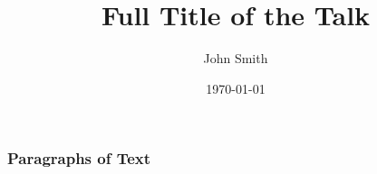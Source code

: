 \documentclass{beamer}
\title[Short title]{Full Title of the Talk}
\author{John Smith}
\institute[UCLA]
{
University of California \\
\medskip
\textit{john@smith.com}
}
\date{\today}
\begin{document}

\begin{frame}
\titlepage
\end{frame}


\begin{frame}
\frametitle{Paragraphs of Text}
\end{frame}

\end{document}
